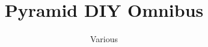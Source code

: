 \documentclass[showtrims]{memoir}
\begin{document}
\title{Pyramid DIY Omnibus}
\author{Various}
\maketitle
\tableofcontents


\end{document}
